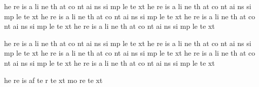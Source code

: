 he
re
is
a
li
ne
th
at
co
nt
ai
ns
si
mp
le
te
xt
he
re
is
a
li
ne
th
at
co
nt
ai
ns
si
mp
le
te
xt
he
re
is
a
li
ne
th
at
co
nt
ai
ns
si
mp
le
te
xt
he
re
is
a
li
ne
th
at
co
nt
ai
ns
si
mp
le
te
xt
he
re
is
a
li
ne
th
at
co
nt
ai
ns
si
mp
le
te
xt %

he
re
is
a
li
ne
th
at
co
nt
ai
ns
si
mp
le
te
xt
he
re
is
a
li
ne
th
at
co
nt
ai
ns
si
mp
le
te
xt
he
re
is
a
li
ne
th
at
co
nt
ai
ns
si
mp
le
te
xt
he
re
is
a
li
ne
th
at
co
nt
ai
ns
si
mp
le
te
xt
he
re
is
a
li
ne
th
at
co
nt
ai
ns
si
mp
le
te
xt%

he
re
is
af
te
r
te
xt
mo
re
te
xt %

